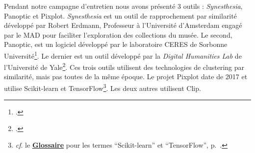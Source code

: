 Pendant notre campagne d'entretien nous avons présenté 3 outils : \textit{Synesthesia}, Panoptic et Pixplot. \textit{Synesthesia} est un outil de rapprochement par similarité développé par Robert Erdmann, Professeur à l'Université d'Amsterdam engagé par le MAD pour faciliter l'exploration des collections du musée. Le second, Panoptic, est un logiciel développé par le laboratoire CERES de Sorbonne Université\footnote{\cite{noauthor_ceres_nodate}.}. Le dernier est un outil développé par la \textit{Digital Humanities Lab} de l'Université de Yale\footnote{\cite{noauthor_yale_nodate}.}. Ces trois outils utilisent des technologies de clustering par similarité, mais pas toutes de la même époque. Le projet Pixplot date de 2017 et utilise Scikit-learn et TensorFlow\footnote{\textit{cf}. le \textbf{\hyperref[sec:Glossaire]{Glossaire}} pour les termes \enquote{Scikit-learn} et \enquote{TensorFlow}, p.~\pageref{sec:Glossaire}.}. Les deux autres utilisent Clip. 

